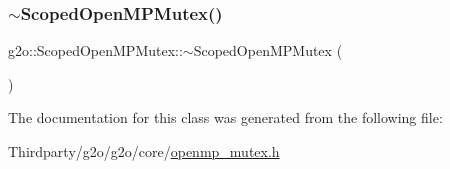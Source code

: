 \mbox{\label{classg2o_1_1_scoped_open_m_p_mutex_af3c190c5fba832ce48db9edf6ea10552}} 
\subsubsection{\texorpdfstring{$\sim$\+Scoped\+Open\+M\+P\+Mutex()}{~ScopedOpenMPMutex()}}
{\footnotesize\ttfamily g2o\+::\+Scoped\+Open\+M\+P\+Mutex\+::$\sim$\+Scoped\+Open\+M\+P\+Mutex (\begin{DoxyParamCaption}{ }\end{DoxyParamCaption})\hspace{0.3cm}{\ttfamily [inline]}}



The documentation for this class was generated from the following file\+:\begin{DoxyCompactItemize}
\item 
Thirdparty/g2o/g2o/core/\mbox{\hyperlink{openmp__mutex_8h}{openmp\+\_\+mutex.\+h}}\end{DoxyCompactItemize}
